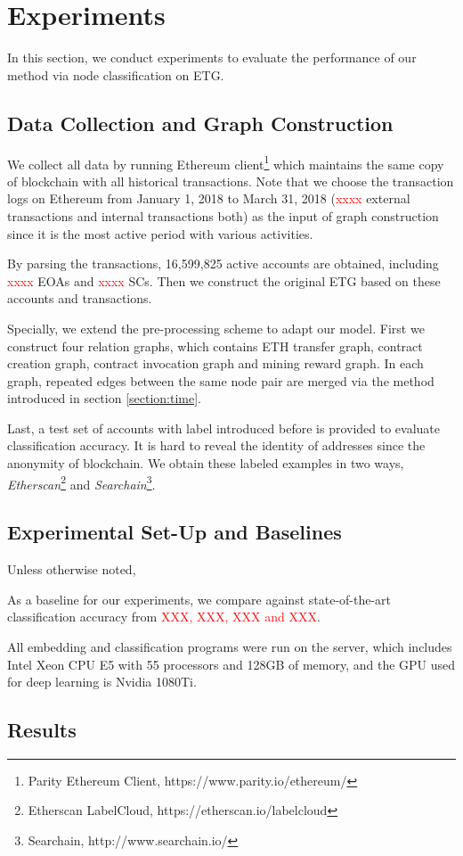 
\section{Experiments}
In this section, we conduct experiments to evaluate the performance of our method via node classification on ETG.  

\subsection{Data Collection and Graph Construction}
We collect all data by running Ethereum client\footnote{Parity Ethereum Client, https://www.parity.io/ethereum/} which maintains the same copy of blockchain with all historical transactions. Note that we choose the transaction logs on Ethereum from January 1, 2018 to March 31, 2018 (\textcolor{red}{xxxx} external transactions and internal transactions both) as the input of graph construction since it is the most active period with various activities.

By parsing the transactions, 16,599,825 active accounts are obtained, including \textcolor{red}{xxxx} EOAs and \textcolor{red}{xxxx} SCs. Then we construct the original ETG based on these accounts and transactions.

Specially, we extend the pre-processing scheme to adapt our model. First we construct four relation graphs, which contains ETH transfer graph, contract creation graph, contract invocation graph and mining reward graph. In each graph, repeated edges between the same node pair are merged via the method introduced in section \ref{section:time}.

Last, a test set of accounts with label introduced before is provided to evaluate classification accuracy. It is hard to reveal the identity of addresses since the anonymity of blockchain. We obtain these labeled examples in two ways, \emph{Etherscan}\footnote{Etherscan LabelCloud, https://etherscan.io/labelcloud} and \emph{Searchain}\footnote{Searchain, http://www.searchain.io/}.


\subsection{Experimental Set-Up and Baselines}
Unless otherwise noted, 

As a baseline for our experiments, we compare against state-of-the-art classification accuracy from \textcolor{red}{XXX, XXX, XXX and XXX}.

All embedding and classification programs were run on the server, which includes Intel Xeon CPU E5 with 55 processors and 128GB of memory, and the GPU used for deep learning is Nvidia 1080Ti.

\subsection{Results}


